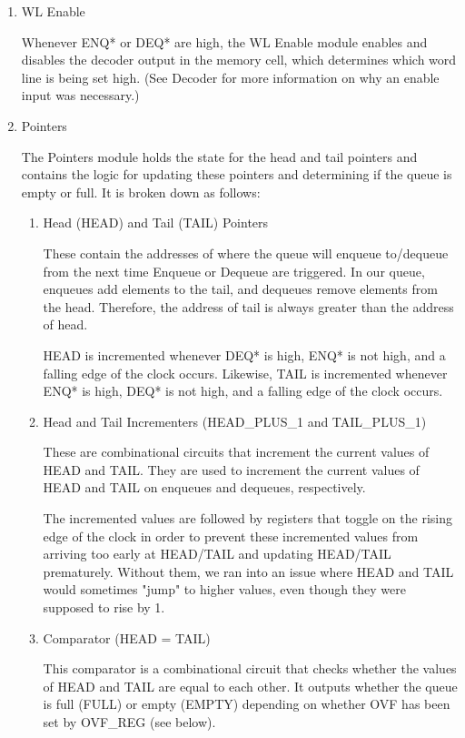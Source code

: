 \documentclass[12pt]{report}
\begin{document}
\begin{enumerate}
  \item WL Enable

  Whenever ENQ* or DEQ* are high, the WL Enable module enables and disables the decoder output in the memory cell, which determines which word line is being set high. (See Decoder for more information on why an enable input was necessary.)

  \item Pointers

  The Pointers module holds the state for the head and tail pointers and contains the logic for updating these pointers and determining if the queue is empty or full. It is broken down as follows:
  \begin{enumerate}
    \item Head (HEAD) and Tail (TAIL) Pointers

    These contain the addresses of where the queue will enqueue to/dequeue from the next time Enqueue or Dequeue are triggered. In our queue, enqueues add elements to the tail, and dequeues remove elements from the head. Therefore, the address of tail is always greater than the address of head.

    HEAD is incremented whenever DEQ* is high, ENQ* is not high, and a falling edge of the clock occurs. Likewise, TAIL is incremented whenever ENQ* is high, DEQ* is not high, and a falling edge of the clock occurs.

    \item Head and Tail Incrementers (HEAD\_PLUS\_1 and TAIL\_PLUS\_1)

    These are combinational circuits that increment the current values of HEAD and TAIL. They are used to increment the current values of HEAD and TAIL on enqueues and dequeues, respectively.

    The incremented values are followed by registers that toggle on the rising edge of the clock in order to prevent these incremented values from arriving too early at HEAD/TAIL and updating HEAD/TAIL prematurely. Without them, we ran into an issue where HEAD and TAIL would sometimes "jump" to higher values, even though they were supposed to rise by 1.

    \item Comparator (HEAD = TAIL)

    This comparator is a combinational circuit that checks whether the values of HEAD and TAIL are equal to each other. It outputs whether the queue is full (FULL) or empty (EMPTY) depending on whether OVF has been set by OVF\_REG (see below).


\end{enumerate}
\end{enumerate}
\end{document}
